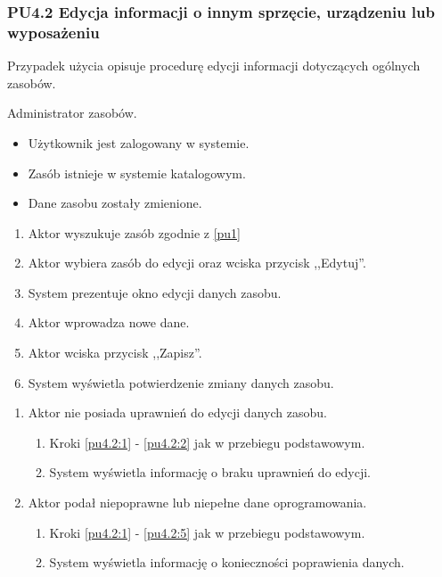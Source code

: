 \subsubsection{PU4.2 Edycja informacji o innym sprzęcie, urządzeniu lub wyposażeniu}

Przypadek użycia opisuje procedurę edycji informacji dotyczących ogólnych zasobów.

Administrator zasobów.

\begin{itemize}
\item Użytkownik jest zalogowany w systemie.
\item Zasób istnieje w systemie katalogowym.
\end{itemize}

\begin{itemize}
\item Dane zasobu zostały zmienione.
\end{itemize}

\begin{enumerate}
\item \label{pu4.2:1} Aktor wyszukuje zasób zgodnie z \ref{pu1}
\item \label{pu4.2:2} Aktor wybiera zasób do edycji oraz wciska przycisk ,,Edytuj''.
\item System prezentuje okno edycji danych zasobu.
\item Aktor wprowadza nowe dane.
\item \label{pu4.2:5} Aktor wciska przycisk ,,Zapisz''.
\item System wyświetla potwierdzenie zmiany danych zasobu.
\end{enumerate}

\begin{enumerate}
\item Aktor nie posiada uprawnień do edycji danych zasobu.
	\begin{enumerate}[label*=\arabic*.]
		\item Kroki \ref{pu4.2:1} - \ref{pu4.2:2} jak w przebiegu podstawowym.
		\item System wyświetla informację o braku uprawnień do edycji.
	\end{enumerate}
\item Aktor podał niepoprawne lub niepełne dane oprogramowania.
	\begin{enumerate}[label*=\arabic*.]
		\item Kroki \ref{pu4.2:1} - \ref{pu4.2:5} jak w przebiegu podstawowym.
		\item System wyświetla informację o konieczności poprawienia danych.
	\end{enumerate}
\end{enumerate}


